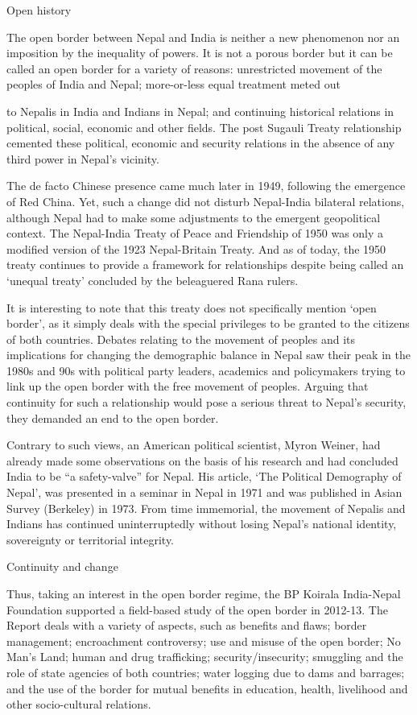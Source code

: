 \documentclass[
  openany]{book}
\begin{document}
Open history

The open border between Nepal and India is neither a new phenomenon nor an imposition by the inequality of powers. It is not a porous border but it can be called an open border for a variety of reasons: unrestricted movement of the peoples of India and Nepal; more-or-less equal treatment meted out

to Nepalis in India and Indians in Nepal; and continuing historical relations in political, social, economic and other fields. The post Sugauli Treaty relationship cemented these political, economic and security relations in the absence of any third power in Nepal's vicinity.

The de facto Chinese presence came much later in 1949, following the emergence of Red China. Yet, such a change did not disturb Nepal-India bilateral relations, although Nepal had to make some adjustments to the emergent geopolitical context. The Nepal-India Treaty of Peace and Friendship of 1950 was only a modified version of the 1923 Nepal-Britain Treaty. And as of today, the 1950 treaty continues to provide a framework for relationships despite being called an `unequal treaty' concluded by the beleaguered Rana rulers.

It is interesting to note that this treaty does not specifically mention `open border', as it simply deals with the special privileges to be granted to the citizens of both countries. Debates relating to the movement of peoples and its implications for changing the demographic balance in Nepal saw their peak in the 1980s and 90s with political party leaders, academics and policymakers trying to link up the open border with the free movement of peoples. Arguing that continuity for such a relationship would pose a serious threat to Nepal's security, they demanded an end to the open border.

Contrary to such views, an American political scientist, Myron Weiner, had already made some observations on the basis of his research and had concluded India to be ``a safety-valve'' for Nepal. His article, `The Political Demography of Nepal', was presented in a seminar in Nepal in 1971 and was published in Asian Survey (Berkeley) in 1973. From time immemorial, the movement of Nepalis and Indians has continued uninterruptedly without losing Nepal's national identity, sovereignty or territorial integrity.

Continuity and change

Thus, taking an interest in the open border regime, the BP Koirala India-Nepal Foundation supported a field-based study of the open border in 2012-13. The Report deals with a variety of aspects, such as benefits and flaws; border management; encroachment controversy; use and misuse of the open border; No Man's Land; human and drug trafficking; security/insecurity; smuggling and the role of state agencies of both countries; water logging due to dams and barrages; and the use of the border for mutual benefits in education, health, livelihood and other socio-cultural relations.
\end{document}
